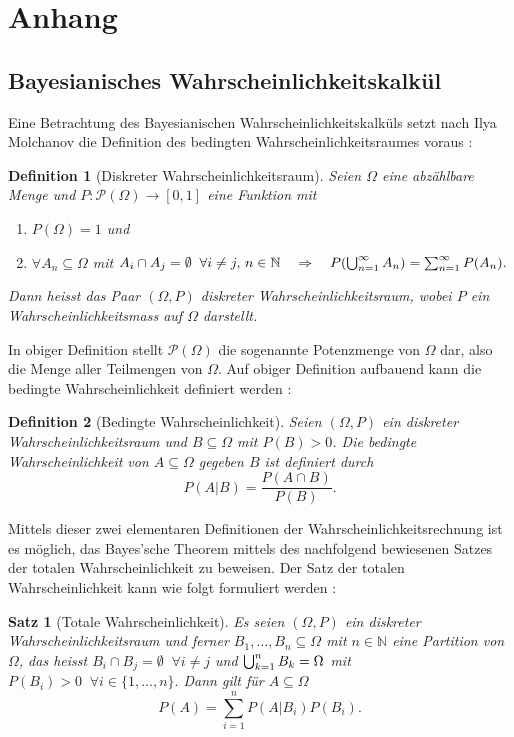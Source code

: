\documentclass[a4paper,11pt]{article}
\numberwithin{equation}{section}
\newtheorem{tn}{Satz}[subsection]
\newtheorem{dn}{Definition}[subsection]
\begin{document}
\section{Anhang}
\subsection{Bayesianisches Wahrscheinlichkeitskalkül}
Eine Betrachtung des Bayesianischen Wahrscheinlichkeitskalküls setzt nach Ilya Molchanov die Definition des bedingten Wahrscheinlichkeitsraumes voraus \cite[S. 9]{Molchanov.2017}:
\begin{dn}[Diskreter Wahrscheinlichkeitsraum]
	Seien $\Omega$ eine abzählbare Menge und $P: \mathcal{P}(\Omega) \rightarrow [0,1]$ eine Funktion mit \begin{enumerate}
		\item $P(\Omega)=1$ und
		\item $\forall A_n \subseteq \Omega$ mit $A_i \cap A_j = \emptyset \;\; \forall i \neq j, \,n \in \mathbb{N} \quad  \Rightarrow \quad P(\bigcup\displaylimits_{n=1}^{\infty} A_n) = \sum_{n=1}^{\infty} P(A_n).$
	\end{enumerate}
Dann heisst das Paar $(\Omega, P)$ diskreter Wahrscheinlichkeitsraum, wobei $P$ ein Wahrscheinlichkeitsmass auf $\Omega$ darstellt.
\end{dn}
In obiger Definition stellt $\mathcal{P}(\Omega)$ die sogenannte Potenzmenge von $\Omega$ dar, also die Menge aller Teilmengen von $\Omega$. Auf obiger Definition aufbauend kann die bedingte Wahrscheinlichkeit definiert werden \cite[S. 16]{Molchanov.2017}: 
\begin{dn}[Bedingte Wahrscheinlichkeit]
	Seien $(\Omega,P)$ ein diskreter Wahrscheinlichkeitsraum und $B\subseteq \Omega$ mit $P(B) > 0$. Die bedingte Wahrscheinlichkeit von $A\subseteq \Omega$ gegeben $B$ ist definiert durch \begin{equation}P(A|B)=\frac{P(A \cap B)}{P(B)}.\end{equation}
\end{dn}
Mittels dieser zwei elementaren Definitionen der Wahrscheinlichkeitsrechnung ist es möglich, das Bayes'sche Theorem mittels des nachfolgend bewiesenen Satzes der totalen Wahrscheinlichkeit zu beweisen. Der Satz der totalen Wahrscheinlichkeit kann wie folgt formuliert werden \cite[S. 17]{Molchanov.2017}:
\begin{tn}[Totale Wahrscheinlichkeit]\label{totwahr}
Es seien $(\Omega, P)$ ein diskreter Wahrscheinlichkeitsraum und ferner $B_1,\dots,B_n \subseteq \Omega$ mit $n \in \mathbb{N}$ eine Partition von $\Omega$, das heisst $B_i \cap B_j = \emptyset \;\; \forall i \neq j$ und $\bigcup\displaylimits_{k=1}^{n}B_k = \Omega$ mit $P(B_i) > 0 \;\; \forall i \in \{1,\dots,n\}.$ Dann gilt für $A\subseteq \Omega$ \begin{equation}P(A) = \sum_{i=1}^{n}P(A|B_i)P(B_i).\end{equation}
\end{tn}
\end{document}
